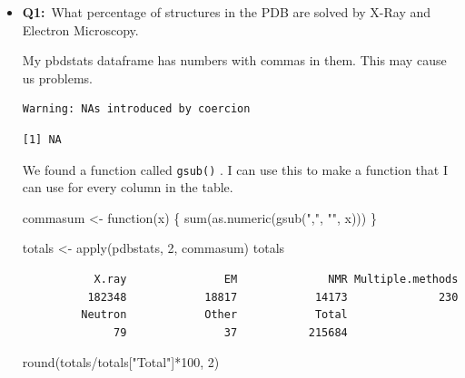 \documentclass[
  letterpaper,
  DIV=11,
  numbers=noendperiod]{scrartcl}
\newenvironment{Shaded}{\begin{snugshade}}{\end{snugshade}}
\newcommand{\ControlFlowTok}[1]{\textcolor[rgb]{0.00,0.23,0.31}{#1}}
\newcommand{\DecValTok}[1]{\textcolor[rgb]{0.68,0.00,0.00}{#1}}
\newcommand{\FunctionTok}[1]{\textcolor[rgb]{0.28,0.35,0.67}{#1}}
\newcommand{\NormalTok}[1]{\textcolor[rgb]{0.00,0.23,0.31}{#1}}
\newcommand{\OtherTok}[1]{\textcolor[rgb]{0.00,0.23,0.31}{#1}}
\newcommand{\SpecialCharTok}[1]{\textcolor[rgb]{0.37,0.37,0.37}{#1}}
\newcommand{\StringTok}[1]{\textcolor[rgb]{0.13,0.47,0.30}{#1}}
\begin{document}
\begin{itemize}
\item
  \textbf{Q1:}~What percentage of structures in the PDB are solved by
  X-Ray and Electron Microscopy.

  My pbdstats dataframe has numbers with commas in them. This may cause
  us problems.

\begin{Shaded}
\end{Shaded}

\begin{verbatim}
Warning: NAs introduced by coercion
\end{verbatim}

\begin{verbatim}
[1] NA
\end{verbatim}

  We found a function called \texttt{gsub()} . I can use this to make a
  function that I can use for every column in the table.

\begin{Shaded}
\begin{Highlighting}[]
\NormalTok{commasum }\OtherTok{\textless{}{-}} \ControlFlowTok{function}\NormalTok{(x) \{}
  \FunctionTok{sum}\NormalTok{(}\FunctionTok{as.numeric}\NormalTok{(}\FunctionTok{gsub}\NormalTok{(}\StringTok{","}\NormalTok{, }\StringTok{""}\NormalTok{, x)))}
\NormalTok{\}}

\NormalTok{totals }\OtherTok{\textless{}{-}} \FunctionTok{apply}\NormalTok{(pdbstats, }\DecValTok{2}\NormalTok{, commasum)}
\NormalTok{totals}
\end{Highlighting}
\end{Shaded}

\begin{verbatim}
           X.ray               EM              NMR Multiple.methods 
          182348            18817            14173              230 
         Neutron            Other            Total 
              79               37           215684 
\end{verbatim}

\begin{Shaded}
\begin{Highlighting}[]
\FunctionTok{round}\NormalTok{(totals}\SpecialCharTok{/}\NormalTok{totals[}\StringTok{"Total"}\NormalTok{]}\SpecialCharTok{*}\DecValTok{100}\NormalTok{, }\DecValTok{2}\NormalTok{)}
\end{Highlighting}
\end{Shaded}


\end{itemize}
\end{document}
